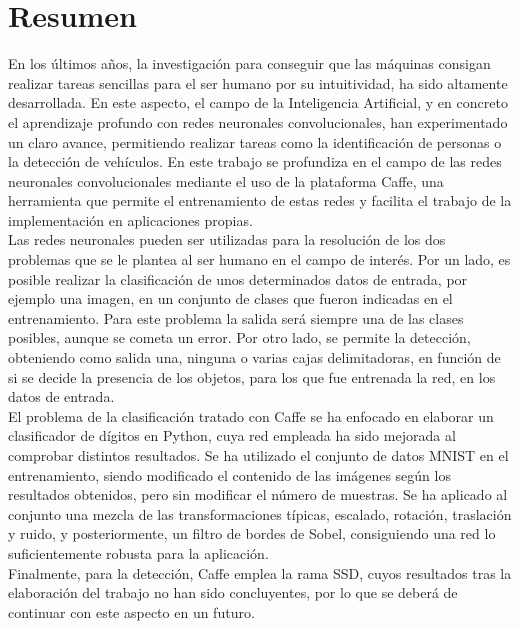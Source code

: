 \chapter*{Resumen}

En los últimos años, la investigación para conseguir que las máquinas consigan realizar tareas sencillas para el ser humano por su intuitividad, ha sido altamente desarrollada. En este aspecto, el campo de la Inteligencia Artificial, y en concreto el aprendizaje profundo con redes neuronales convolucionales, han experimentado un claro avance, permitiendo realizar tareas como la identificación de personas o la detección de vehículos. En este trabajo se profundiza en el campo de las redes neuronales convolucionales mediante el uso de la plataforma Caffe, una herramienta que permite el entrenamiento de estas redes y facilita el trabajo de la implementación en aplicaciones propias.\\

Las redes neuronales pueden ser utilizadas para la resolución de los dos problemas que se le plantea al ser humano en el campo de interés. Por un lado, es posible realizar la clasificación de unos determinados datos de entrada, por ejemplo una imagen, en un conjunto de clases que fueron indicadas en el entrenamiento.  Para este problema la salida será siempre una de las clases posibles, aunque se cometa un error. Por otro lado, se permite la detección, obteniendo como salida una, ninguna o varias cajas delimitadoras, en función de si se decide la presencia de los objetos, para los que fue entrenada la red, en los datos de entrada.\\

El problema de la clasificación tratado con Caffe se ha enfocado en elaborar un clasificador de dígitos en Python, cuya red empleada ha sido mejorada al comprobar distintos resultados. Se ha utilizado el conjunto de datos MNIST en el entrenamiento, siendo modificado el contenido de las imágenes según los resultados obtenidos, pero sin modificar el número de muestras. Se ha aplicado al conjunto una mezcla de las transformaciones típicas, escalado, rotación, traslación y ruido, y posteriormente, un filtro de bordes de Sobel, consiguiendo una red lo suficientemente robusta para la aplicación.\\

Finalmente, para la detección, Caffe emplea la rama SSD, cuyos resultados tras la elaboración del trabajo no han sido concluyentes, por lo que se deberá de continuar con este aspecto en un futuro.